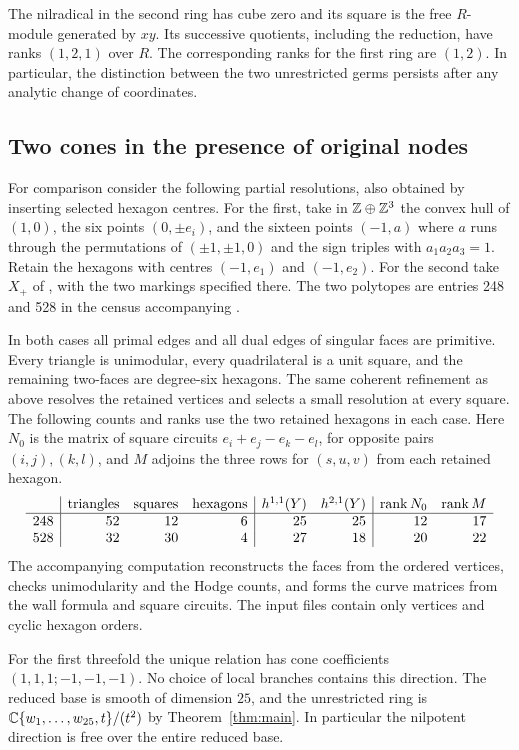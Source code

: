 The nilradical in the second ring has cube zero and its square is
the free $R$-module generated by $xy$. Its successive quotients,
including the reduction, have ranks $(1,2,1)$ over $R$. The
corresponding ranks for the first ring are $(1,2)$. In particular, the distinction
between the two unrestricted germs persists after any analytic change
of coordinates.

\subsection{Two cones in the presence of original nodes}
For comparison consider the following partial resolutions, also obtained
by inserting selected hexagon centres. For the first, take in
$\mathbb Z\oplus\mathbb Z^3$ the convex hull of $(1,0)$, the six points
$(0,\pm e_i)$, and the sixteen points $(-1,a)$ where $a$ runs through
the permutations of $(\pm1,\pm1,0)$ and the sign triples with
$a_1a_2a_3=1$. Retain the hexagons with centres $(-1,e_1)$ and
$(-1,e_2)$. For the second take $X_+$ of \cite[\S5]{Partial},
with the two markings specified there. The two polytopes are entries
248 and 528 in the census accompanying \cite{W5}.

In both cases all primal edges and all dual edges of singular faces
are primitive. Every triangle is unimodular, every quadrilateral is
a unit square, and the remaining two-faces are degree-six hexagons.
The same coherent refinement as above resolves the retained vertices
and selects a small resolution at every square. The following counts
and ranks use the two retained hexagons in each case. Here $N_0$ is
the matrix of square circuits $e_i+e_j-e_k-e_l$, for opposite pairs
$(i,j),(k,l)$, and $M$ adjoins
the three rows for $(s,u,v)$ from each retained hexagon.
\[
\begin{array}{c|rrr|rr|rr}
 &\text{triangles}&\text{squares}&\text{hexagons}&
 h^{1,1}(Y)&h^{2,1}(Y)&\operatorname{rank} N_0&\operatorname{rank} M\\ \hline
 248&52&12&6&25&25&12&17\\
 528&32&30&4&27&18&20&22
\end{array}
\]
The accompanying computation reconstructs the faces from the ordered
vertices, checks unimodularity and the Hodge counts, and forms the
curve matrices from the wall formula and square circuits. The input
files contain only vertices and cyclic hexagon orders.

For the first threefold the unique relation has cone coefficients
$(1,1,1;-1,-1,-1)$. No choice of local branches contains this
direction. The reduced base is smooth of dimension $25$, and the
unrestricted ring is $\mathbb C\{w_1,\ldots,w_{25},t\}/(t^2)$ by
Theorem~\ref{thm:main}. In particular the nilpotent direction is
free over the entire reduced base.

